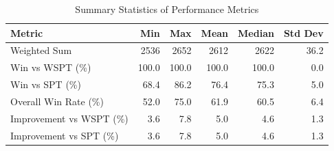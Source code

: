\begin{table}[htbp]%
\centering%
\begin{tabular}{lrrrrr}%
\toprule%
\textbf{Metric}&\textbf{Min}&\textbf{Max}&\textbf{Mean}&\textbf{Median}&\textbf{Std Dev}\\%
\midrule%
Weighted Sum&2536&2652&2612&2622&36.2\\%
Win vs WSPT (\%)&100.0&100.0&100.0&100.0&0.0\\%
Win vs SPT (\%)&68.4&86.2&76.4&75.3&5.0\\%
Overall Win Rate (\%)&52.0&75.0&61.9&60.5&6.4\\%
Improvement vs WSPT (\%)&3.6&7.8&5.0&4.6&1.3\\%
Improvement vs SPT (\%)&3.6&7.8&5.0&4.6&1.3\\%
\bottomrule%
\end{tabular}%
\caption{Summary Statistics of Performance Metrics}%
\label{tab:metrics}%
\end{table}